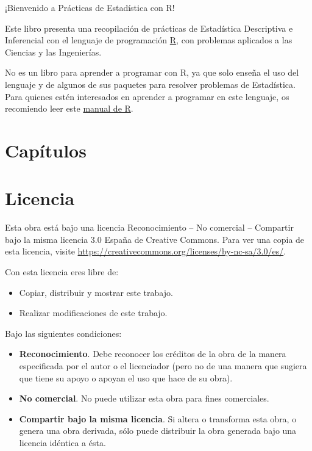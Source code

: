 \documentclass[
  a4paper,
]{scrreport}
\providecommand{\tightlist}{%
  \setlength{\itemsep}{0pt}\setlength{\parskip}{0pt}}\usepackage{longtable,booktabs,array}
\theoremstyle{definition}
\theoremstyle{remark}
\begin{document}

¡Bienvenido a Prácticas de Estadística con R!

Este libro presenta una recopilación de prácticas de Estadística
Descriptiva e Inferencial con el lenguaje de programación
\href{https://www.r-project.org/}{R}, con problemas aplicados a las
Ciencias y las Ingenierías.

No es un libro para aprender a programar con R, ya que solo enseña el
uso del lenguaje y de algunos de sus paquetes para resolver problemas de
Estadística. Para quienes estén interesados en aprender a programar en
este lenguaje, os recomiendo leer este
\href{https://aprendeconalf.es/manual-r/}{manual de R}.

\section*{Capítulos}\label{capuxedtulos}


\label{toc}

\section*{Licencia}\label{licencia}


Esta obra está bajo una licencia Reconocimiento -- No comercial --
Compartir bajo la misma licencia 3.0 España de Creative Commons. Para
ver una copia de esta licencia, visite
\url{https://creativecommons.org/licenses/by-nc-sa/3.0/es/}.

Con esta licencia eres libre de:

\begin{itemize}
\tightlist
\item
  Copiar, distribuir y mostrar este trabajo.
\item
  Realizar modificaciones de este trabajo.
\end{itemize}

Bajo las siguientes condiciones:

\begin{itemize}
\item
  \textbf{Reconocimiento}. Debe reconocer los créditos de la obra de la
  manera especificada por el autor o el licenciador (pero no de una
  manera que sugiera que tiene su apoyo o apoyan el uso que hace de su
  obra).
\item
  \textbf{No comercial}. No puede utilizar esta obra para fines
  comerciales.
\item
  \textbf{Compartir bajo la misma licencia}. Si altera o transforma esta
  obra, o genera una obra derivada, sólo puede distribuir la obra
  generada bajo una licencia idéntica a ésta.
\end{itemize}
\end{document}
